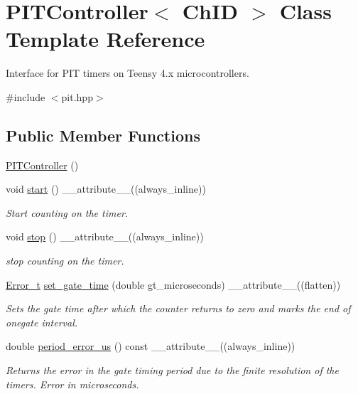\hypertarget{classPITController}{}\section{P\+I\+T\+Controller$<$ Ch\+ID $>$ Class Template Reference}
\label{classPITController}


Interface for P\+IT timers on Teensy 4.\+x microcontrollers.  




{\ttfamily \#include $<$pit.\+hpp$>$}

\subsection*{Public Member Functions}
\begin{DoxyCompactItemize}
\item 
\hyperlink{classPITController_ad9ef4f151495076fad7b0c556e48b117}{P\+I\+T\+Controller} ()
\item 
void \hyperlink{classPITController_a4dae1ed0ada64ebc03665e8f39795e7e}{start} () \+\_\+\+\_\+attribute\+\_\+\+\_\+((always\+\_\+inline))
\begin{DoxyCompactList}\small\item\em Start counting on the timer. \end{DoxyCompactList}\item 
void \hyperlink{classPITController_a5a6e2b00c6355934531a77a62660bec7}{stop} () \+\_\+\+\_\+attribute\+\_\+\+\_\+((always\+\_\+inline))
\begin{DoxyCompactList}\small\item\em stop counting on the timer. \end{DoxyCompactList}\item 
\hyperlink{errors_8hpp_a4e8c0d09726859e3d3369c0da5a1aa7f}{Error\+\_\+t} \hyperlink{classPITController_aaf7a79129a4ea5af057ea8f537b7ae9f}{set\+\_\+gate\+\_\+time} (double gt\+\_\+microseconds) \+\_\+\+\_\+attribute\+\_\+\+\_\+((flatten))
\begin{DoxyCompactList}\small\item\em Sets the gate time after which the counter returns to zero and marks the end of onegate interval. \end{DoxyCompactList}\item 
double \hyperlink{classPITController_a3fedb5ff5a44b664e8132f4e2836b155}{period\+\_\+error\+\_\+us} () const \+\_\+\+\_\+attribute\+\_\+\+\_\+((always\+\_\+inline))
\begin{DoxyCompactList}\small\item\em Returns the error in the gate timing period due to the finite resolution of the timers.  Error in microseconds. \end{DoxyCompactList}\item 

\end{DoxyCompactItemize}
